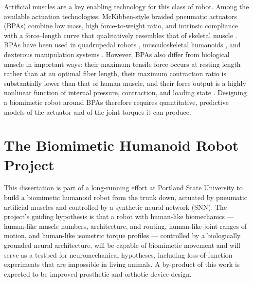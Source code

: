 Artificial muscles are a key enabling technology for this class of robot. Among the available actuation technologies, McKibben-style braided pneumatic actuators (BPAs) combine low mass, high force-to-weight ratio, and intrinsic compliance with a force--length curve that qualitatively resembles that of skeletal muscle \citep{liang_comparative_2020, hunt_modeling_2017}. BPAs have been used in quadrupedal robots \citep{aschenbeck_design_2006, hunt_modeling_2017, scharzenberger_design_2019}, musculoskeletal humanoids \citep{asano_design_2017, hitzmann_anthropomorphic_2018}, and dexterous manipulation systems \citep{chen_realizing_2019}. However, BPAs also differ from biological muscle in important ways: their maximum tensile force occurs at resting length rather than at an optimal fiber length, their maximum contraction ratio is substantially lower than that of human muscle, and their force output is a highly nonlinear function of internal pressure, contraction, and loading state \citep{hunt_modeling_2017, sarosi_comparative_2017, liang_comparative_2020}. Designing a biomimetic robot around BPAs therefore requires quantitative, predictive models of the actuator and of the joint torques it can produce.

\section{The Biomimetic Humanoid Robot Project}\label{sec:project}

This dissertation is part of a long-running effort at Portland State University to build a biomimetic humanoid robot from the trunk down, actuated by pneumatic artificial muscles and controlled by a synthetic neural network (SNN). The project's guiding hypothesis is that a robot with human-like biomechanics --- human-like muscle numbers, architecture, and routing, human-like joint ranges of motion, and human-like isometric torque profiles --- controlled by a biologically grounded neural architecture, will be capable of biomimetic movement and will serve as a testbed for neuromechanical hypotheses, including loss-of-function experiments that are impossible in living animals. A by-product of this work is expected to be improved prosthetic and orthotic device design.

